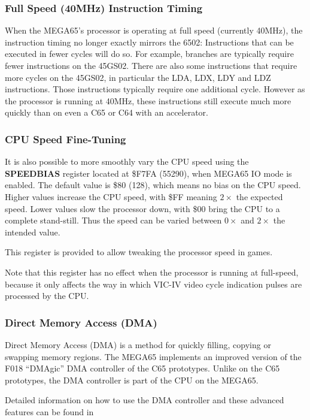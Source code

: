 \subsubsection{Full Speed (40MHz) Instruction Timing}

When the MEGA65's processor is operating at full speed
(currently 40MHz), the instruction
timing no longer exactly mirrors the 6502: Instructions that can be
executed in fewer cycles
will do so. For example, branches are typically require fewer instructions on the 45GS02.
There are also some instructions that require more cycles on the 45GS02, in particular the
LDA, LDX, LDY and LDZ instructions. Those instructions typically require one additional cycle.
However as the processor is running at 40MHz, these instructions still execute much more quickly
than on even a C65 or C64 with an accelerator.

\subsubsection{CPU Speed Fine-Tuning}
It is also possible to more smoothly
vary the CPU speed using the {\bf SPEEDBIAS} register located at \$F7FA (55290), when MEGA65 IO mode
is enabled.  The default value is \$80 (128), which means no bias on the CPU speed.  Higher values
increase the CPU speed, with \$FF meaning $2\times$ the expected speed. Lower values slow
the processor down, with \$00 bring the CPU to a complete stand-still.  Thus the speed can be
varied between $0\times$ and $2\times$ the intended value.

This register is provided to allow tweaking the processor speed in games.

Note that this register has no effect when
the processor is running at full-speed, because it only affects the way in which VIC-IV
video cycle indication pulses are processed by the CPU.

\subsubsection{Direct Memory Access (DMA)}
Direct Memory Access (DMA) is a method for quickly filling, copying or swapping memory regions.
The MEGA65 implements an improved version of the F018 ``DMAgic'' DMA controller of the C65 prototypes.
 Unlike on the C65 prototypes, the DMA controller is part of the CPU on the MEGA65.

Detailed information on how to use the DMA controller and these advanced features can be found in 

